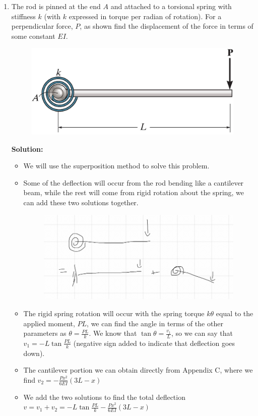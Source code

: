 \documentclass[12pt, oneside]{article}
\begin{document}
\begin{enumerate}
	\item %
		The rod is pinned at the end $A$ and attached to a torsional spring with stiffness $k$ (with $k$ expressed in torque per radian of rotation).
		For a perpendicular force, $P$, as shown find the displacement of the force in terms of some constant $EI$.
		\begin{figure}[H]
			\centering
			\includegraphics[width=0.6\linewidth]{12-93}
		\end{figure}
			\textbf{Solution:}
			\begin{itemize}
				\item We will use the superposition method to solve this problem.
				\item Some of the deflection will occur from the rod bending like a cantilever beam, while the rest will come from rigid rotation about the spring, we can add these two solutions together.
					\begin{figure}[H]
						\centering
						\includegraphics[width=0.6\linewidth]{12-93a}
					\end{figure}
				\item The rigid spring rotation will occur with the spring torque $k\theta$ equal to the applied moment, $PL$, we can find the angle in terms of the other parameters as $\theta = \frac{PL}{k}$. We know that $\tan \theta = \frac{v_1}{L}$, so we can say that $v_1 = -L \tan \frac{PL}{k}$ (negative sign added to indicate that deflection goes down).
				\item The cantilever portion we can obtain directly from Appendix C, where we find  $v_2 = -\frac{Px^2}{6EI}(3L - x)$
				\item We add the two solutions to find the total deflection $v = v_1 + v_2 =  -L \tan \frac{PL}{k} -\frac{Px^2}{6EI}(3L - x)$
			\end{itemize}

\end{enumerate}
\end{document}
